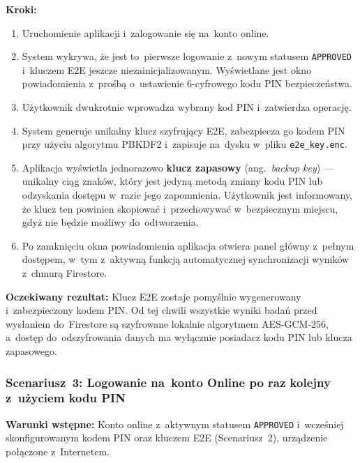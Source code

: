 \documentclass[12pt, a4paper, oneside]{report}
\begin{document}
\textbf{Kroki:}
\begin{enumerate}[noitemsep]
	\item Uruchomienie aplikacji i~zalogowanie się na~konto online.
	\item System wykrywa, że jest to~pierwsze logowanie z~nowym statusem \texttt{APPROVED}
	      i~kluczem E2E jeszcze niezainicjalizowanym. Wyświetlane jest okno powiadomienia z~prośbą
	      o~ustawienie 6-cyfrowego kodu PIN bezpieczeństwa.
	\item Użytkownik dwukrotnie wprowadza wybrany kod PIN i~zatwierdza operację.
	\item System generuje unikalny klucz szyfrujący E2E, zabezpiecza go kodem PIN
	      przy użyciu algorytmu PBKDF2 i~zapisuje na~dysku w~pliku \texttt{e2e\_key.enc}.
	\item Aplikacja wyświetla jednorazowo \textbf{klucz zapasowy} (ang.\ \textit{backup key})
	      --- unikalny ciąg znaków, który jest jedyną metodą zmiany kodu PIN lub odzyskania
	      dostępu w~razie jego zapomnienia. Użytkownik jest informowany, że klucz ten powinien
	      skopiować i~przechowywać w~bezpiecznym miejscu, gdyż nie będzie możliwy do~odtworzenia.
	\item Po zamknięciu okna powiadomienia aplikacja otwiera panel główny z~pełnym dostępem,
	      w~tym z~aktywną funkcją automatycznej synchronizacji wyników z~chmurą Firestore.
\end{enumerate}

\textbf{Oczekiwany rezultat:} Klucz E2E zostaje pomyślnie wygenerowany i~zabezpieczony
kodem PIN. Od tej chwili wszystkie wyniki badań przed wysłaniem do~Firestore są szyfrowane
lokalnie algorytmem AES-GCM-256, a~dostęp do~odszyfrowania danych ma wyłącznie
posiadacz kodu PIN lub klucza zapasowego.

\subsubsection*{Scenariusz~3: Logowanie na~konto Online po raz kolejny z~użyciem kodu PIN}
\label{scen:3}

\textbf{Warunki wstępne:} Konto online z~aktywnym statusem \texttt{APPROVED} i~wcześniej skonfigurowanym kodem PIN oraz kluczem E2E (Scenariusz~2), urządzenie połączone z~Internetem.
\end{document}
